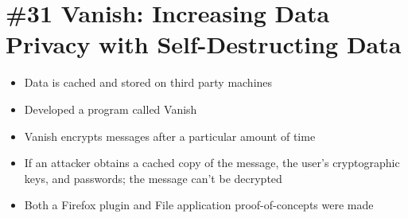 \section{\#31 Vanish: Increasing Data Privacy with Self-Destructing Data}
\begin{itemize}
	\item Data is cached and stored on third party machines
	\item Developed a program called Vanish
	\item Vanish encrypts messages after a particular amount of time
	\item If an attacker obtains a cached copy of the message, the user's cryptographic keys, and passwords; the message can't be decrypted
	\item Both a Firefox plugin and File application proof-of-concepts were made
\end{itemize}